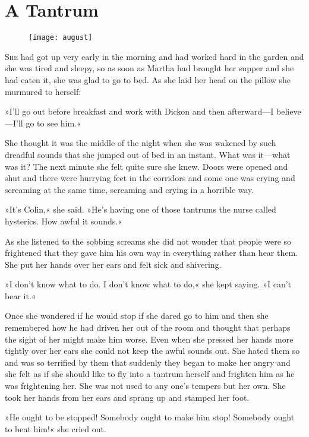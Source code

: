 \chapter{A Tantrum} 
	
\begin{figure}[t!]
\centering
\texttt{[image: august]}
\end{figure}

 \lettrine[lines=6]{S}{he} had got up very early in the morning and had worked hard in the garden and she was tired and sleepy, so as soon as Martha had brought her supper and she had eaten it, she was glad to go to bed. As she laid her head on the pillow she murmured to herself:

\zz
»I'll go out before breakfast and work with Dickon and then afterward—I believe—I'll go to see him.«

She thought it was the middle of the night when she was wakened by such dreadful sounds that she jumped out of bed in an instant. What was it—what was it? The next minute she felt quite sure she knew. Doors were opened and shut and there were hurrying feet in the corridors and some one was crying and screaming at the same time, screaming and crying in a horrible way.

»It's Colin,« she said. »He's having one of those tantrums the nurse called hysterics. How awful it sounds.«

As she listened to the sobbing screams she did not wonder that people were so frightened that they gave him his own way in everything rather than hear them. She put her hands over her ears and felt sick and shivering.

»I don't know what to do. I don't know what to do,« she kept saying. »I can't bear it.«

Once she wondered if he would stop if she dared go to him and then she remembered how he had driven her out of the room and thought that perhaps the sight of her might make him worse. Even when she pressed her hands more tightly over her ears she could not keep the awful sounds out. She hated them so and was so terrified by them that suddenly they began to make her angry and she felt as if she should like to fly into a tantrum herself and frighten him as he was frightening her. She was not used to any one's tempers but her own. She took her hands from her ears and sprang up and stamped her foot.

»He ought to be stopped! Somebody ought to make him stop! Somebody ought to beat him!« she cried out.

